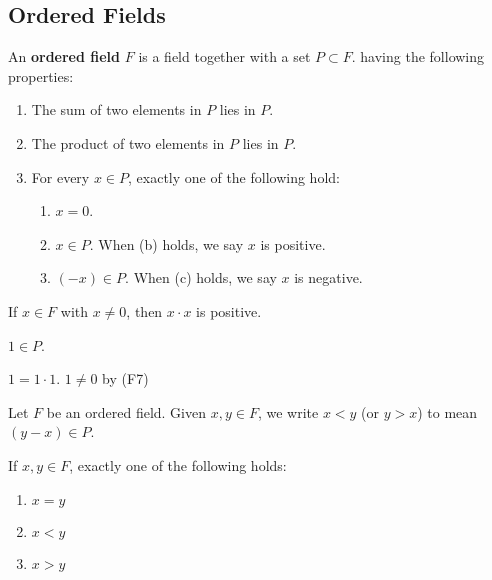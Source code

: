\subsection{Ordered Fields}

\begin{definition}
	An {\bfseries ordered field} $F$ is a field together with a set $P \subset F$.
	having the following properties:

	\begin{enumerate}[label={\bfseries O\theenumi.}]
		\item The sum of two elements in $P$ lies in $P$.

		\item The product of two elements in $P$ lies in $P$.

		\item For every $x \in P$, exactly one of the following hold:
		\begin{enumerate}
			\item $x = 0$.
			\item $x \in P$. When (b) holds, we say $x$ is positive.
			\item $(-x) \in P$. When (c) holds, we say $x$ is negative.
		\end{enumerate}


	\end{enumerate}
\end{definition}

\begin{prop}
	If $x \in F$ with $x \neq 0$, then $x \cdot x$ is positive.
\end{prop}

\begin{corollary}
	$1 \in P$. 

	$1 = 1 \cdot 1$. 
	$1 \neq 0$ by (F7)
\end{corollary}

\begin{definition}
	Let $F$ be an ordered field. Given $x,y \in F$, we write $x < y$ (or $y > x$)
	to mean $(y-x) \in P$.
\end{definition}

\begin{prop}
	If $x,y \in F$, exactly one of the following holds:
	\begin{enumerate}
		\item $x=y$
		\item $x<y$
		\item $x>y$
	\end{enumerate}
\end{prop}

